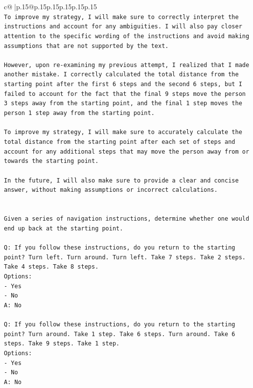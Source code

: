 \documentclass{article}
\begin{document}
{\begin{supertabular}{c@{$\;$}|p{.15\linewidth}@{}p{.15\linewidth}p{.15\linewidth}p{.15\linewidth}p{.15\linewidth}p{.15\linewidth}}
{{{\\ 
\texttt{To improve my strategy, I will make sure to correctly interpret the instructions and account for any ambiguities. I will also pay closer attention to the specific wording of the instructions and avoid making assumptions that are not supported by the text.} \\
\\ 
\texttt{However, upon re{-}examining my previous attempt, I realized that I made another mistake. I correctly calculated the total distance from the starting point after the first 6 steps and the second 6 steps, but I failed to account for the fact that the final 9 steps move the person 3 steps away from the starting point, and the final 1 step moves the person 1 step away from the starting point. } \\
\\ 
\texttt{To improve my strategy, I will make sure to accurately calculate the total distance from the starting point after each set of steps and account for any additional steps that may move the person away from or towards the starting point.} \\
\\ 
\texttt{In the future, I will also make sure to provide a clear and concise answer, without making assumptions or incorrect calculations.} \\
\\ 
\\ 
\texttt{Given a series of navigation instructions, determine whether one would end up back at the starting point.} \\
\\ 
\texttt{Q: If you follow these instructions, do you return to the starting point? Turn left. Turn around. Turn left. Take 7 steps. Take 2 steps. Take 4 steps. Take 8 steps.} \\
\texttt{Options:} \\
\texttt{{-} Yes} \\
\texttt{{-} No} \\
\texttt{A: No} \\
\\ 
\texttt{Q: If you follow these instructions, do you return to the starting point? Turn around. Take 1 step. Take 6 steps. Turn around. Take 6 steps. Take 9 steps. Take 1 step.} \\
\texttt{Options:} \\
\texttt{{-} Yes} \\
\texttt{{-} No} \\
\texttt{A: No} \\
}}}
\end{supertabular}}
\end{document}
